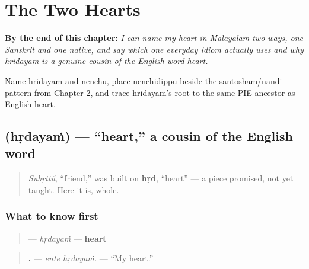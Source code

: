 
\chapter{The Two Hearts}
\label{ch:ml-two-hearts}

\begin{chapteropening}
\textbf{By the end of this chapter:} \emph{I can name my heart in Malayalam two ways, one Sanskrit and one native, and say which one everyday idiom actually uses and why hridayam is a genuine cousin of the English word heart.}

Name hridayam and nenchu, place nenchidippu beside the santosham/nandi pattern from Chapter 2, and trace hridayam's root to the same PIE ancestor as English heart.
\end{chapteropening}

\section[\texorpdfstring{\ml{ഹൃദയം} (hṛdayaṁ)}{ഹൃദയം (hṛdayaṁ)}]{ (hṛdayaṁ) — \textquotedblleft{}heart,\textquotedblright{} a cousin of the English word}

\label{lesson:ML-C38-hrudayam}



\begin{quote}
\emph{Suhṛttŭ}, \textquotedblleft{}friend,\textquotedblright{} was built on \textbf{hṛd}, \textquotedblleft{}heart\textquotedblright{} — a piece promised, not yet taught. Here it is, whole.
\end{quote}

\subsection*{What to know first}
\begin{quote}
\textbf{} — \emph{hṛdayaṁ} — \textbf{heart}
\end{quote}

\begin{quote}
\textbf{ .} — \emph{ente hṛdayaṁ.} — \textquotedblleft{}My heart.\textquotedblright{}
\end{quote}

